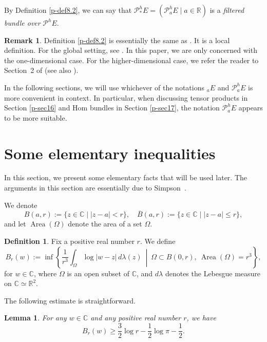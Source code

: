 \documentclass[12pt,twoside]{amsart}
\DeclareMathOperator{\Area}{Area}
\newtheorem{lem}[thm]{Lemma}
\theoremstyle{definition}
\newtheorem{defn}[thm]{Definition}
\newtheorem{rem}[thm]{Remark}
\begin{document}
By Definition \ref{p-def8.2}, we can say that 
$\mathcal P^h_*E=\left(\mathcal P^h_a E\mid a\in \mathbb R\right)$ 
is a {\em{filtered bundle over}} $\mathcal P^hE$. 

\begin{rem}\label{p-rem8.3}
Definition \ref{p-def8.2} is 
essentially the same as 
\cite[2.11.1, Filtered Bundles on a Neighborhood of $0$ in $\mathbb{C}$]{mochizuki6}.  
It is a local definition. For the global setting, see \cite[2.11.3, Global Case]{mochizuki6}.  
In this paper, we are only concerned with the one-dimensional case.  
For the higher-dimensional case, we refer the reader to Section~2 of \cite{mochizuki5} (see also \cite[Section 4]{ffo}).
\end{rem}

In the following sections, we will 
use whichever of the notations ${}_a E$ and $\mathcal{P}^h_a E$ 
is more convenient in context. 
In particular, when discussing tensor products 
in Section \ref{p-sec16} and Hom bundles in Section \ref{p-sec17}, 
the notation $\mathcal{P}^h_a E$ appears to be more suitable.

\section{Some elementary inequalities}\label{p-sec9}

In this section, we present some elementary facts that will be used later.  
The arguments in this section are essentially due to Simpson~\cite{simpson3}.

We denote
\[
B(a, r) := \{ z \in \mathbb{C} \mid |z - a| < r \}, \quad
\overline{B}(a, r) := \{ z \in \mathbb{C} \mid |z - a| \leq r \},
\]
and let $\Area(\Omega)$ denote the area of a set $\Omega$.

\begin{defn}
\label{p-def9.1}
Fix a positive real number $r$.
We define
\[
B_r(w) :=
\inf\left\{
\frac{1}{r^3} \int_{\Omega} \log |w - z| \, d\lambda(z)
\ \middle| \
\Omega \subset B(0, r),\ \Area(\Omega) = r^3
\right\},
\]
for $w \in \mathbb C$, 
where $\Omega$ is an open subset of $\mathbb C$, and $d\lambda$ denotes the Lebesgue 
measure on $\mathbb C \simeq \mathbb R^2$.
\end{defn}

The following estimate is straightforward.

\begin{lem}
\label{p-lem9.2}
For any $w \in \mathbb C$ and any positive real number $r$, we have
\[
B_r(w)
\ge
\frac{3}{2} \log r - \frac{1}{2} \log \pi - \frac{1}{2}.
\]
\end{lem}
\end{document}
